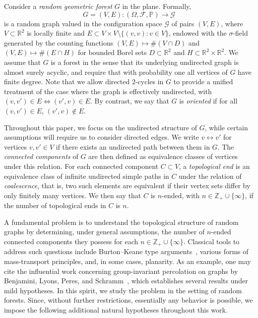 \documentclass[a4paper, 11pt]{article} %
\theoremstyle{plain}
\newcommand{\R}{\mathbb{R}}
\newcommand{\Z}{\mathbb{Z}}
\newcommand{\1}{\mathds 1}
\renewcommand{\P}{\mathbb{P}}
\numberwithin{equation}{section}
\begin{document}
\label{section_introduction}


Consider a \emph{random geometric forest} $G$ in the plane. Formally,
    \[G=(V,E):(\Omega,\mathcal F,\P)\to\mathcal G\]
is a random graph valued in the configuration space $\mathcal G$ of pairs $(V, E)$, where $V\subset\R^2$ is locally finite and $E\subset V\times V\setminus\{(v, v):v\in V\}$, endowed with the $\sigma$-field generated by the counting functions $(V, E)\mapsto\#(V\cap D)$ and $(V, E)\mapsto\#(E\cap H)$ for bounded Borel sets $D\subset\R^2$ and $H\subset\R^2\times\R^2$. We assume that $G$ is a forest in the sense that its underlying undirected graph is almost surely acyclic, and require that with probability one all vertices of $G$ have finite degree. Note that we allow directed $2$-cycles in $G$ to provide a unified treatment of the case where the graph is effectively undirected, with $(v, v')\in E\iff(v', v)\in E$. By contrast, we say that $G$ is \emph{oriented} if for all $(v, v')\in E$, $(v',v)\notin E$.

Throughout this paper, we focus on the undirected structure of $G$, while certain assumptions will require us to consider directed edges. We write $v\leftrightarrow v'$ for vertices $v,v'\in V$ if there exists an undirected path between them in $G$. The \emph{connected components} of $G$ are then defined as equivalence classes of vertices under this relation. For each connected component $C\subset V$, a \emph{topological end} is an equivalence class of infinite undirected simple paths in $C$ under the relation of \emph{coalescence}, that is, two such elements are equivalent if their vertex sets differ by only finitely many vertices. We then say that $C$ is $n$-ended, with $n\in\Z_+\cup\{\infty\}$, if the number of topological ends in $C$ is $n$.

A fundamental problem is to understand the topological structure of random graphs by determining, under general assumptions, the number of $n$-ended connected components they possess for each $n\in\Z_+\cup\{\infty\}$. Classical tools to address such questions include Burton–Keane type arguments~\cite{burton_and_keane}, various forms of mass-transport principles, and, in some cases, planarity. As an example, one may cite the influential work concerning group-invariant percolation on graphs by Benjamini, Lyons, Peres, and Schramm~\cite{BLPS}, which establishes several results under mild hypotheses. In this spirit, we study the problem in the setting of random forests. Since, without further restrictions, essentially any behavior is possible, we impose the following additional natural hypotheses throughout this work.
\end{document}
